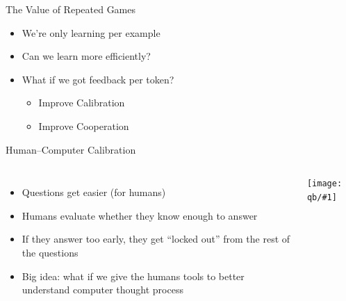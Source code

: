 \documentclass[compress]{beamer}
\newcommand{\fsi}[2]{
\begin{frame}[plain]
\vspace*{-1pt}
\makebox[\linewidth]{\texttt{[image: \#1]}}
\begin{center}
#2
\end{center}
\end{frame}
}
\newcommand{\gfxq}[2]{
\begin{center}
	\texttt{[image: qb/\#1]}
\end{center}
}
\begin{document}
\fsi{advcal/qanta_2025}{}

\begin{frame}{The Value of Repeated Games}

  \begin{itemize}
  \item We're only learning per example
  \item Can we learn more efficiently?
  \item What if we got feedback per token?
    \pause
    \begin{itemize}
      \item Improve Calibration
      \item Improve Cooperation
    \end{itemize}
  \end{itemize}

\end{frame}

\begin{frame}{Human--Computer Calibration}
	\begin{columns}
		\begin{itemize}
			\item Questions get easier
			(for humans)
			\item Humans evaluate whether they know enough to answer
			\item If they answer too early, they get “locked out” from the rest of the questions
			\item Big idea: what if we give the humans tools to better understand computer thought process
			
		\end{itemize}
		
		\gfxq{example_game}{1.0}
	\end{columns}
	
\end{frame}
\end{document}
